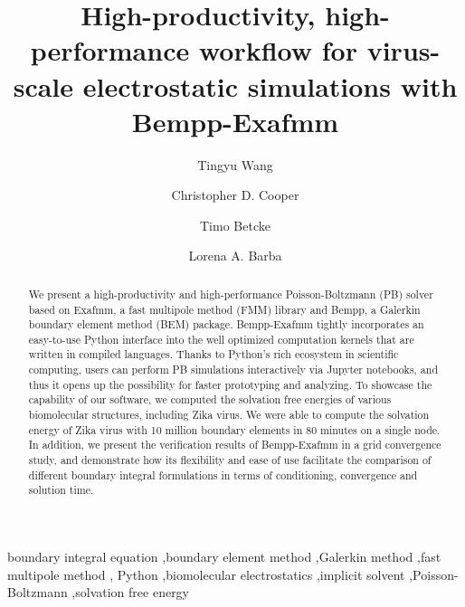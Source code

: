 \documentclass[final,5p,times,twocolumn]{elsarticle}
\begin{document}
\begin{frontmatter}
\title{High-productivity, high-performance workflow for virus-scale electrostatic simulations with Bempp-Exafmm}

\author[gwu]{Tingyu Wang}

\author[usm]{Christopher D. Cooper}

\author[ucl]{Timo Betcke}

\author[gwu]{Lorena A. Barba}

\address[gwu]{Department of Mechanical and Aerospace Engineering, The George Washington University, Washington DC}
\address[usm]{Department of Mechanical Engineering and Centro Cient\'ifico Tecnol\'ogico de Valpara\'iso, Universidad T\'ecnica Federico Santa Mar\'ia, Valpara\'iso, Chile}
\address[ucl]{Department of Mathematics, University College London, UK}

\begin{abstract}
    We present a high-productivity and high-performance Poisson-Boltzmann (PB) solver based on Exafmm, a fast multipole method (FMM) library and Bempp, a Galerkin boundary element method (BEM) package.
    Bempp-Exafmm tightly incorporates an easy-to-use Python interface into the well optimized computation kernels that are written in compiled languages.
    Thanks to Python's rich ecosystem in scientific computing, users can perform PB simulations interactively via Jupyter notebooks, and thus it opens up the possibility for faster prototyping and analyzing.
    To showcase the capability of our software, we computed the solvation free energies of various biomolecular structures, including Zika virus.
    We were able to compute the solvation energy of Zika virus with 10 million boundary elements in 80 minutes on a single node.
    In addition, we present the verification results of Bempp-Exafmm in a grid convergence study, and demonstrate how its flexibility and ease of use facilitate the comparison of different boundary integral formulations in terms of conditioning, convergence and solution time.
\end{abstract}

\begin{keyword}
    boundary integral equation \sep boundary element method \sep Galerkin method \sep fast multipole method \sep
    Python \sep biomolecular electrostatics \sep implicit solvent \sep Poisson-Boltzmann \sep solvation free energy
\end{keyword}

\end{frontmatter}
\end{document}
